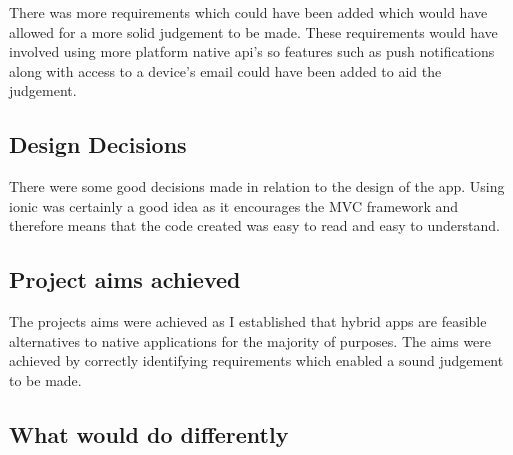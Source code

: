 There was more requirements which could have been added which would have allowed for a more solid judgement to be made. These requirements would have involved using more platform native api's so features such as push notifications along with access to a device's email could have been added to aid the judgement.
\subsection{Design Decisions}
There were some good decisions made in relation to the design of the app. Using ionic was certainly a good idea as it encourages the MVC framework and therefore means that the code created was easy to read and easy to understand. 
\subsection{Project aims achieved}
The projects aims were achieved as I established that hybrid apps are feasible alternatives to native applications for the majority of purposes. The aims were achieved by correctly identifying requirements which enabled a sound judgement to be made.
\subsection{What would do differently}
